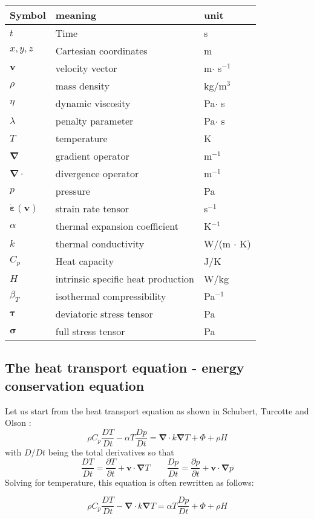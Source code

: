 
\begin{center}
\begin{tabular}{lll}
\hline
Symbol & meaning & unit \\
\hline
\hline
$t$ & Time & s \\
$x,y,z$ & Cartesian coordinates & m \\
${\bm v}$ & velocity vector & m$\cdot$ s$^{-1}$\\
$\rho$ & mass density & kg/m$^3$ \\
$\eta$ & dynamic viscosity &  Pa$\cdot$ s \\
$\lambda$ & penalty parameter & Pa$\cdot$ s \\
$T$ & temperature & K \\
${\bm \nabla}$ & gradient operator & m$^{-1}$ \\
${\bm \nabla}\cdot$ & divergence operator & m$^{-1}$ \\
$p$ & pressure & Pa\\
$\dot{\bm \varepsilon}({\bm v})$ & strain rate tensor & s$^{-1}$ \\
$\alpha$ & thermal expansion coefficient & K$^{-1}$ \\
$k$ & thermal conductivity & W/(m $\cdot$ K) \\
$C_p$ & Heat capacity & J/K \\
$H$ & intrinsic specific heat production & W/kg\\
$\beta_T$ & isothermal compressibility & Pa$^{-1}$  \\
${\bm \tau}$ & deviatoric stress tensor & Pa \\
${\bm \sigma}$ & full stress tensor & Pa \\
\hline
\end{tabular}
\end{center}

\subsection{The heat transport equation - energy conservation equation}

Let us start from the heat transport equation as shown in Schubert, Turcotte and Olson \cite{scto01}:
\[
\rho C_p \frac{DT}{Dt} - \alpha T \frac{Dp}{Dt} = {\bm \nabla} \cdot k {\bm \nabla} T + \Phi + \rho H  
\]
with $D/Dt$ being the total derivatives so that 
\[
\frac{DT}{Dt} = \frac{\partial T}{\partial t} + {\bm v}\cdot {\bm \nabla}T
\quad\quad
\frac{Dp}{Dt} = \frac{\partial p}{\partial t} + {\bm v}\cdot {\bm \nabla}p
\]
Solving for temperature, this equation is often rewritten as follows:
\begin{mdframed}[backgroundcolor=blue!5]
\[
\rho C_p \frac{DT}{Dt} - {\bm \nabla} \cdot k {\bm \nabla} T =  \alpha T \frac{Dp}{Dt} + \Phi + \rho H  
\]
\end{mdframed}

